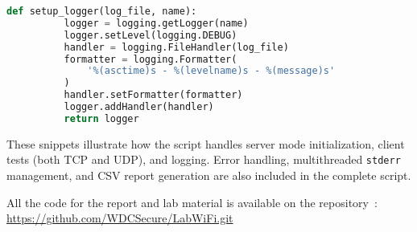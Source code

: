         \begin{lstlisting}[language=Python, caption={Excerpt for logging setup.}]
      def setup_logger(log_file, name):
          logger = logging.getLogger(name)
          logger.setLevel(logging.DEBUG)
          handler = logging.FileHandler(log_file)
          formatter = logging.Formatter(
              '%(asctime)s - %(levelname)s - %(message)s'
          )
          handler.setFormatter(formatter)
          logger.addHandler(handler)
          return logger
        \end{lstlisting}

    \noindent These snippets illustrate how the script handles server mode initialization, client tests (both TCP and UDP), and logging. 
    Error handling, multithreaded \texttt{stderr} management, and CSV report generation are also included in the complete script.
    
    \noindent All the code for the report and lab material is available on the repository~\cite{LabWiFiRepo}: \url{https://github.com/WDCSecure/LabWiFi.git}
